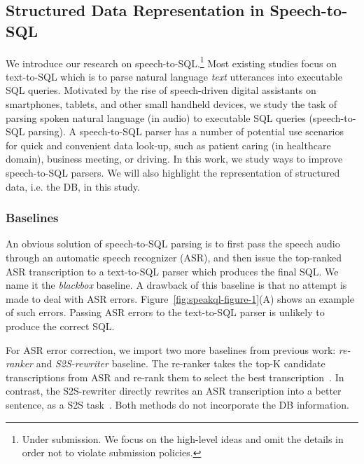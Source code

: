 \documentclass[11pt,dvipdfm]{article}
\begin{document}
\subsection{Structured Data Representation in Speech-to-SQL}
We introduce our research on speech-to-SQL.\footnote{Under submission. We focus on the high-level ideas and omit the details in order not to violate submission policies.}
Most existing studies focus on text-to-SQL which is to parse natural language \textit{text} utterances into  executable SQL queries.
Motivated by the rise of speech-driven digital assistants on smartphones, tablets, and other small handheld devices, we study the task of parsing spoken natural language (in audio) to executable SQL queries (speech-to-SQL parsing). A speech-to-SQL parser has a number of potential use scenarios for quick and convenient data look-up, such as patient caring (in healthcare domain), business meeting, or driving.
In this work, we study ways to improve speech-to-SQL parsers. We will also highlight the representation of structured data, i.e. the DB, in this study.

\subsubsection{Baselines}
An obvious solution of speech-to-SQL parsing is to first pass the speech audio through an automatic speech recognizer (ASR), and then issue the top-ranked ASR transcription to a text-to-SQL parser which produces the final SQL.
We name it the \textit{blackbox} baseline.
A drawback of this baseline is that no attempt is made to deal with ASR errors. Figure~\ref{fig:speakql-figure-1}(A) shows an example of such errors. Passing ASR errors to the text-to-SQL parser is unlikely to produce the correct SQL.

For ASR error correction, we import two more baselines from previous work: \textit{re-ranker} and \textit{S2S-rewriter} baseline. The re-ranker takes the top-K candidate transcriptions from ASR and re-rank them to select the best transcription~\cite{ASR-Reranker}. In contrast, the S2S-rewriter directly rewrites an ASR transcription into a better sentence, as a S2S task~\cite{ASR-S2S}. Both methods do not incorporate the DB information.
\end{document}
